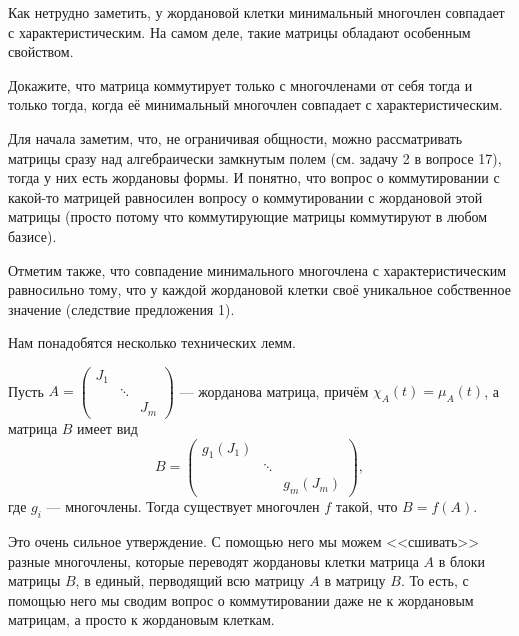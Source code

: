 Как нетрудно заметить, у жордановой клетки минимальный многочлен совпадает с характеристическим. На самом деле, такие матрицы обладают особенным свойством.

\begin{problem}[А.\,А. Клячко]
    Докажите, что матрица коммутирует только с многочленами от себя тогда и только тогда, когда её минимальный многочлен совпадает с характеристическим.
\end{problem}

Для начала заметим, что, не ограничивая общности, можно рассматривать матрицы сразу над алгебраически замкнутым полем (см. задачу 2 в вопросе 17), тогда у них есть жордановы формы. И понятно, что вопрос о коммутировании с какой-то матрицей равносилен вопросу о коммутировании с жордановой этой матрицы (просто потому что коммутирующие матрицы коммутируют в любом базисе).

Отметим также, что совпадение минимального многочлена с характеристическим равносильно тому, что у каждой жордановой клетки своё уникальное собственное значение (следствие предложения 1).

Нам понадобятся несколько технических лемм.

\begin{lemma}
    Пусть
    $
    A =
    \begin{pmatrix}
        J_1 &  & \\
         & \ddots & \\
         & & J_m
    \end{pmatrix}
    $ --- жорданова матрица, причём $\chi_A(t) = \mu_A(t)$, а матрица $B$ имеет вид
    \[
        B =
        \begin{pmatrix}
            g_1(J_1) & & \\
             & \ddots & \\
             & & g_m(J_m)
        \end{pmatrix},
    \]
    где $g_i$ --- многочлены. Тогда существует многочлен $f$ такой, что $B = f(A)$.
\end{lemma}

\begin{remark}
    Это очень сильное утверждение. С помощью него мы можем <<сшивать>> разные многочлены, которые переводят жордановы клетки матрица $A$ в блоки матрицы $B$, в единый, перводящий всю матрицу $A$ в матрицу $B$. То есть, с помощью него мы сводим вопрос о коммутировании даже не к жордановым матрицам, а просто к жордановым клеткам.
\end{remark}

